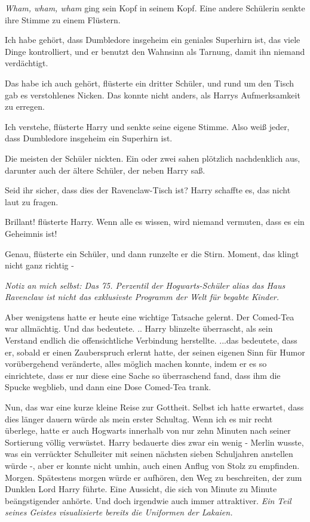 \emph{Wham, wham, wham} ging sein Kopf in seinem Kopf. Eine andere Schülerin
senkte ihre Stimme zu einem Flüstern.

\glqq{}Ich habe gehört, dass Dumbledore insgeheim ein geniales Superhirn ist,
das viele Dinge kontrolliert, und er benutzt den Wahnsinn als Tarnung, damit ihn
niemand verdächtigt.\grqq{}

\glqq{}Das habe ich auch gehört\grqq{}, flüsterte ein dritter Schüler, und rund
um den Tisch gab es verstohlenes Nicken. Das konnte nicht anders, als Harrys
Aufmerksamkeit zu erregen.

\glqq{}Ich verstehe\grqq{}, flüsterte Harry und senkte seine eigene Stimme.
\glqq{} Also weiß jeder, dass Dumbledore insgeheim ein Superhirn ist.\grqq{}

Die meisten der Schüler nickten. Ein oder zwei sahen plötzlich nachdenklich aus,
darunter auch der ältere Schüler, der neben Harry saß.

Seid ihr sicher, dass dies der Ravenclaw-Tisch ist? Harry schaffte es, das nicht
laut zu fragen.

\glqq{}Brillant!\grqq{} flüsterte Harry. \glqq{}Wenn alle es wissen, wird
niemand vermuten, dass es ein Geheimnis ist!\grqq{}

\glqq{}Genau\grqq{}, flüsterte ein Schüler, und dann runzelte er die Stirn.
\glqq{} Moment, das klingt nicht ganz richtig -\grqq{}

\emph{Notiz an mich selbst: Das 75. Perzentil der Hogwarts-Schüler alias das
Haus Ravenclaw ist nicht das exklusivste Programm der Welt für begabte Kinder.}

Aber wenigstens hatte er heute eine wichtige Tatsache gelernt. Der Comed-Tea war
allmächtig. Und das bedeutete. .. Harry blinzelte überrascht, als sein Verstand
endlich die offensichtliche Verbindung herstellte. ...das bedeutete, dass er,
sobald er einen Zauberspruch erlernt hatte, der seinen eigenen Sinn für Humor
vorübergehend veränderte, alles möglich machen konnte, indem er es so
einrichtete, dass er nur diese eine Sache so überraschend fand, dass ihm die
Spucke wegblieb, und dann eine Dose Comed-Tea trank.

Nun, das war eine kurze kleine Reise zur Gottheit. Selbst ich hatte erwartet,
dass dies länger dauern würde als mein erster Schultag. Wenn ich es mir recht
überlege, hatte er auch Hogwarts innerhalb von nur zehn Minuten nach seiner
Sortierung völlig verwüstet. Harry bedauerte dies zwar ein wenig - Merlin
wusste, was ein verrückter Schulleiter mit seinen nächsten sieben Schuljahren
anstellen würde -, aber er konnte nicht umhin, auch einen Anflug von Stolz zu
empfinden. Morgen. Spätestens morgen würde er aufhören, den Weg zu beschreiten,
der zum Dunklen Lord Harry führte. Eine Aussicht, die sich von Minute zu Minute
beängstigender anhörte. Und doch irgendwie auch immer attraktiver. \emph{Ein
Teil seines Geistes visualisierte bereits die Uniformen der Lakaien.}

